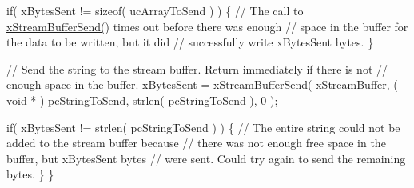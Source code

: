 \begin{DoxyPre} if( xBytesSent != sizeof( ucArrayToSend ) )
 \{
     // The call to \hyperlink{stream__buffer_8h_a35cdf3b6bf677086b9128782f762499d}{xStreamBufferSend()} times out before there was enough
     // space in the buffer for the data to be written, but it did
     // successfully write xBytesSent bytes.
 \}\end{DoxyPre}



\begin{DoxyPre} // Send the string to the stream buffer.  Return immediately if there is not
 // enough space in the buffer.
 xBytesSent = xStreamBufferSend( xStreamBuffer, ( void * ) pcStringToSend, strlen( pcStringToSend ), 0 );\end{DoxyPre}



\begin{DoxyPre} if( xBytesSent != strlen( pcStringToSend ) )
 \{
     // The entire string could not be added to the stream buffer because
     // there was not enough free space in the buffer, but xBytesSent bytes
     // were sent.  Could try again to send the remaining bytes.
 \}
\}
\end{DoxyPre}
 